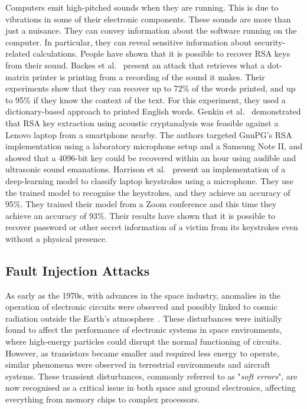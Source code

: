 Computers emit high-pitched sounds when they are running. This is due to vibrations in some of their electronic components. These sounds are more than just a nuisance. They can convey information about the software running on the computer. In particular, they can reveal sensitive information about security-related calculations. People have shown that it is possible to recover RSA keys from their sound.
Backes et al.~\cite{BDGPS-10-usenix} present an attack that retrieves what a dot-matrix printer is printing from a recording of the sound it makes. Their experiments show that they can recover up to 72\% of the words printed, and up to 95\% if they know the context of the text. For this experiment, they used a dictionary-based approach to printed English words.
Genkin et al.~\cite{GST-17-crypto} demonstrated that RSA key extraction using acoustic cryptanalysis was feasible against a Lenovo laptop from a smartphone nearby. The authors targeted GnuPG's RSA implementation using a laboratory microphone setup and a Samsung Note II, and showed that a 4096-bit key could be recovered within an hour using audible and ultrasonic sound emanations. Harrison et al.~\cite{HTM-23-eurospw} present an implementation of a deep-learning model to classify laptop keystrokes using a microphone. They use the trained model to recognise the keystrokes, and they achieve an accuracy of 95\%. They trained their model from a Zoom conference and this time they achieve an accuracy of 93\%. Their results have shown that it is possible to recover password or other secret information of a victim from its keystrokes even without a physical presence.

\subsection{Fault Injection Attacks}
As early as the 1970s, with advances in the space industry, anomalies in the operation of electronic circuits were observed and possibly linked to cosmic radiation outside the Earth's atmosphere~\cite{BSH-75-tns,Z-96-ibm,ZL-79-science}. These disturbances were initially found to affect the performance of electronic systems in space environments, where high-energy particles could disrupt the normal functioning of circuits. However, as transistors became smaller and required less energy to operate, similar phenomena were observed in terrestrial environments and aircraft systems. These transient disturbances, commonly referred to as "\textit{soft errors}", are now recognised as a critical issue in both space and ground electronics, affecting everything from memory chips to complex processors.


